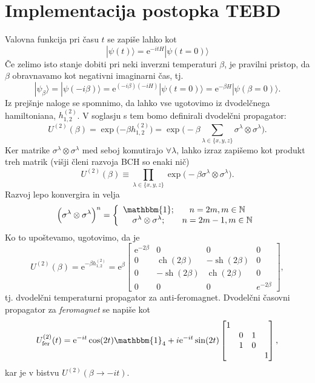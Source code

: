 \documentclass[12pt, a4 paper]{article}
\newcommand{\e}{
	\ensuremath{\mathrm{e}}
}
\newcommand{\ch}{
	\operatorname{ch}
}
\newcommand{\sh}{
	\operatorname{sh}
}
\begin{document}
\section{Implementacija postopka TEBD}

Valovna funkcija pri \v casu $t$ se zapi\v se lahko kot
\[
	|\psi(t)\rangle = \e^{-itH} |\psi(t = 0)\rangle
\]
\v Ce zelimo isto stanje dobiti pri neki inverzni temperaturi $\beta$, je pravilni pristop, da $\beta$ obravnavamo
kot negativni imaginarni \v cas, tj.
\[
	|\psi_{\beta}\rangle = |\psi(-i\beta)\rangle = \e^{(-i\beta)(-i H)}|\psi(t = 0)\rangle = \e^{-\beta H}
		|\psi(\beta=0)\rangle.
\]
Iz prej\v snje naloge se spomnimo, da lahko vse ugotovimo iz dvodel\v cnega hamiltoniana, $h^{(2)}_{1,2}$. V soglasju s tem
bomo definirali dvodel\v cni propagator:
\[
	U^{(2)}(\beta) = \exp\Big({-\beta h^{(2)}_{1,2}}\Big) = \exp\bigg(-\beta\sum_{\lambda \in \{x,y,z\}}\sigma^\lambda
		\otimes \sigma^\lambda\bigg).
\]
Ker matrike $\sigma^\lambda \otimes \sigma^\lambda$ med seboj komutirajo $\forall \lambda$, lahko izraz zapi\v semo kot
produkt treh matrik (vi\v sji \v cleni razvoja BCH so enaki ni\v c)
\begin{equation}
	U^{(2)}(\beta) \equiv \prod_{\lambda \in \{x,y,z\}} \exp\big(-\beta \sigma^\lambda \otimes \sigma^\lambda\big).
\end{equation}
Razvoj lepo konvergira in velja
\[
	\Big(\sigma^\lambda \otimes \sigma^\lambda\Big)^n = \left\{
		\begin{array}{cc}
			\mathbbm{1}; & n = 2m, m \in \mathbb{N} \\
			\sigma^\lambda \otimes \sigma^\lambda; & n = 2m - 1, m \in \mathbb{N}
		\end{array}
	\right.
\]
Ko to upo\v stevamo, ugotovimo, da je
\[
	U^{(2)}(\beta) = \e^{-\beta h^{(2)}_{1,2}} = \e^{\beta}\begin{bmatrix}
		\e^{-2\beta} & 0 & 0 & 0\\
		0 & \ch(2\beta) & -\sh(2\beta) & 0 \\
		0 & -\sh(2\beta) & \ch(2\beta) & 0 \\
		0 & 0 & 0 & e^{-2\beta}
	\end{bmatrix},
\]
tj. dvodel\v cni temperaturni propagator za anti-feromagnet. Dvodel\v cni \v casovni propagator za \emph{feromagnet} se
napi\v se kot
\[
	U^{(2)}_\text{fer}(t) = \e^{-it}\cos(2t)\mathbbm{1}_4 + i\e^{-it}\sin(2t) \begin{bmatrix}
		1 &  &  &  \\
		 & 0 & 1 &  \\
		 & 1 & 0 &  \\
		 &  &  & 1 \end{bmatrix},
\]
kar je v bistvu $U^{(2)}(\beta \to -it)$.
\end{document}
